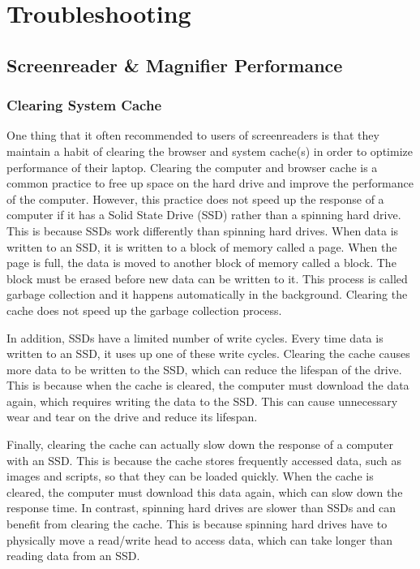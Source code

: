 \documentclass[12pt,letterpaper,twoside]{extreport}
\begin{document}
\begin{appendices}
\hypertarget{troubleshooting}{}\chapter{Troubleshooting}\label{troubleshooting}
\hypertarget{screenmag}{}\section{Screenreader \& Magnifier Performance}\label{screenmag}
\hypertarget{cache}{}\subsection{Clearing System Cache}\label{cache}
One thing that it often recommended to users of screenreaders is that they maintain a habit of clearing the browser and system cache(s) in order to optimize performance of their laptop. Clearing the computer and browser cache is a common practice to free up space on the hard drive and improve the performance of the computer. However, this practice does not speed up the response of a computer if it has a Solid State Drive (SSD) rather than a spinning hard drive. This is because SSDs work differently than spinning hard drives. When data is written to an SSD, it is written to a block of memory called a page. When the page is full, the data is moved to another block of memory called a block. The block must be erased before new data can be written to it. This process is called garbage collection and it happens automatically in the background. Clearing the cache does not speed up the garbage collection process.

In addition, SSDs have a limited number of write cycles. Every time data is written to an SSD, it uses up one of these write cycles. Clearing the cache causes more data to be written to the SSD, which can reduce the lifespan of the drive. This is because when the cache is cleared, the computer must download the data again, which requires writing the data to the SSD. This can cause unnecessary wear and tear on the drive and reduce its lifespan.

Finally, clearing the cache can actually slow down the response of a computer with an SSD. This is because the cache stores frequently accessed data, such as images and scripts, so that they can be loaded quickly. When the cache is cleared, the computer must download this data again, which can slow down the response time. In contrast, spinning hard drives are slower than SSDs and can benefit from clearing the cache. This is because spinning hard drives have to physically move a read/write head to access data, which can take longer than reading data from an SSD.


\end{appendices}
\end{document}

